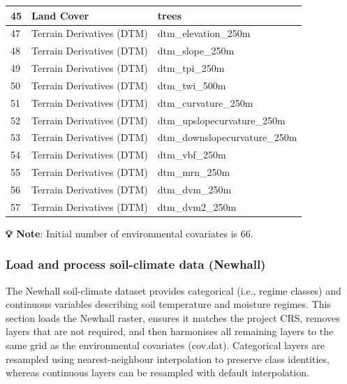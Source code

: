 \documentclass[
  10pt,
  b5paper,
  oneside]{book}
\begin{document}
\begin{table}
\begin{tabular}[t]{l|l|l}
\hline
45 & Land Cover & trees\\
\hline
47 & Terrain Derivatives (DTM) & dtm\_elevation\_250m\\
\hline
48 & Terrain Derivatives (DTM) & dtm\_slope\_250m\\
\hline
49 & Terrain Derivatives (DTM) & dtm\_tpi\_250m\\
\hline
50 & Terrain Derivatives (DTM) & dtm\_twi\_500m\\
\hline
51 & Terrain Derivatives (DTM) & dtm\_curvature\_250m\\
\hline
52 & Terrain Derivatives (DTM) & dtm\_upslopecurvature\_250m\\
\hline
53 & Terrain Derivatives (DTM) & dtm\_downslopecurvature\_250m\\
\hline
54 & Terrain Derivatives (DTM) & dtm\_vbf\_250m\\
\hline
55 & Terrain Derivatives (DTM) & dtm\_mrn\_250m\\
\hline
56 & Terrain Derivatives (DTM) & dtm\_dvm\_250m\\
\hline
57 & Terrain Derivatives (DTM) & dtm\_dvm2\_250m\\
\hline
\end{tabular}
\end{table}

\textbf{💡 Note}: Initial number of environmental covariates is 66.

\subsubsection{Load and process soil-climate data (Newhall)}\label{load-and-process-soil-climate-data-newhall}

The Newhall soil-climate dataset provides categorical (i.e., regime classes) and continuous variables describing soil temperature and moisture regimes. This section loads the Newhall raster, ensures it matches the project CRS, removes layers that are not required, and then harmonises all remaining layers to the same grid as the environmental covariates (cov.dat). Categorical layers are resampled using nearest-neighbour interpolation to preserve class identities, whereas continuous layers can be resampled with default interpolation.
\end{document}
